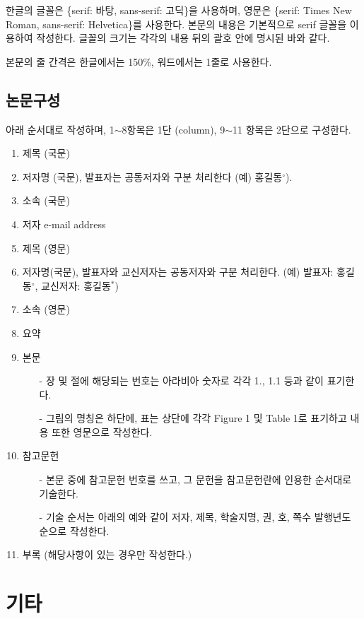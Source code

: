 \documentclass[a4paper,twocolumn]{article}
\begin{document}
한글의 글꼴은 \{serif: 바탕, sans-serif: 고딕\}을 사용하며, 
영문은 \{serif: Times New Roman, sans-serif: Helvetica\}를 사용한다. 
본문의 내용은 기본적으로 serif 글꼴을 이용하여 작성한다.
글꼴의 크기는 각각의 내용 뒤의 괄호 안에 명시된 바와 같다.

본문의 줄 간격은 한글에서는 150\%, 워드에서는 1줄로 사용한다.


\subsection{논문구성}
\label{subsec:paper_structure}

아래 순서대로 작성하며, 1$\sim$8항목은 1단 (column), 
9$\sim$11 항목은 2단으로 구성한다.

\begin{enumerate}
	\item 제목 (국문)
	\item 저자명 (국문), 발표자는 공동저자와 구분 처리한다 (예) 홍길동$^{\circ}$).
	\item 소속 (국문)
	\item 저자 e-mail address
	\item 제목 (영문)
	\item 저자명(국문), 발표자와 교신저자는 공동저자와 구분 처리한다. (예) 발표자: 홍길동$^{\circ}$, 교신저자: 홍길동$^{*}$)
	\item 소속 (영문)
	\item 요약
	\item 본문
	\begin{itemize}
		\item[-] 장 및 절에 해당되는 번호는 아라비아 숫자로 각각 1., 1.1 등과 같이 표기한다.
		\item[-] 그림의 명칭은 하단에, 표는 상단에 각각 Figure 1 및 Table 1로 표기하고 내용 또한 영문으로 작성한다.
	\end{itemize}
	\item 참고문헌
	\begin{itemize}
		\item[-] 본문 중에 참고문헌 번호를 쓰고, 그 문헌을 참고문헌란에 인용한 순서대로 기술한다.
		\item[-] 기술 순서는 아래의 예와 같이 저자, 제목, 학술지명, 권, 호, 쪽수 발행년도 순으로 작성한다.
	\end{itemize}
	\item 부록 (해당사항이 있는 경우만 작성한다.)
\end{enumerate}


\section{기타}
\label{sec:misc}
\end{document}
